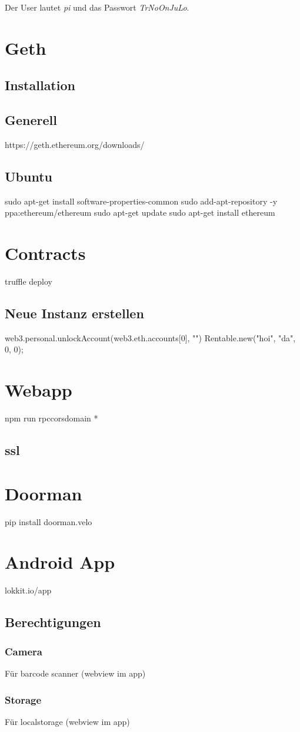 Der User lautet \emph{pi} und das Passwort \emph{TrNoOnJuLo}.

\section{Geth}
\subsection{Installation}
\subsection{Generell}
https://geth.ethereum.org/downloads/

\subsection{Ubuntu}
sudo apt-get install software-properties-common
sudo add-apt-repository -y ppa:ethereum/ethereum
sudo apt-get update
sudo apt-get install ethereum

\section{Contracts}
truffle deploy
\subsection{Neue Instanz erstellen}
web3.personal.unlockAccount(web3.eth.accounts[0], "")
Rentable.new("hoi", "da", 0, 0);

\section{Webapp}
npm run rpccorsdomain *
\subsection{ssl}

\section{Doorman}
pip install doorman.velo

\section{Android App}
lokkit.io/app
\subsection{Berechtigungen}
\subsubsection{Camera}
Für barcode scanner (webview im app)
\subsubsection{Storage}
Für localstorage (webview im app)
